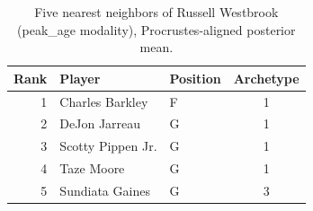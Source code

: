 \begin{table}[htbp]
  \centering\small
  \begin{tabular}{rllc}
    \toprule
    Rank & Player & Position & Archetype \\
    \midrule
    1 & Charles Barkley & F & 1 \\
    2 & DeJon Jarreau & G & 1 \\
    3 & Scotty Pippen Jr. & G & 1 \\
    4 & Taze Moore & G & 1 \\
    5 & Sundiata Gaines & G & 3 \\
    \bottomrule
  \end{tabular}
  \caption{Five nearest neighbors of Russell Westbrook (peak_age modality), Procrustes-aligned posterior mean.}
  \label{tab:Russell_Westbrook_neighbors_peak_age}
\end{table}

